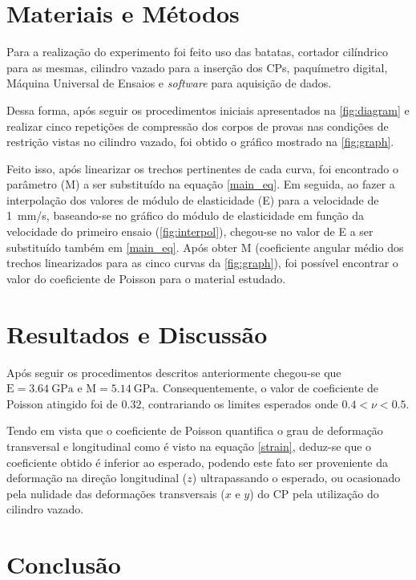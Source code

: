 \documentclass[a4paper, 12pt, brazilian]{article}
\begin{document}
	\section{Materiais e Métodos}
	
	Para a realização do experimento foi feito uso das batatas, cortador cilíndrico para as mesmas, cilindro vazado para a inserção dos CPs, paquímetro digital, Máquina Universal de Ensaios e \textit{software} para aquisição de dados. 
	
	Dessa forma, após seguir os procedimentos iniciais apresentados na  \cref{fig:diagram} e realizar cinco repetições de compressão dos corpos de provas nas condições de restrição vistas no cilindro vazado, foi obtido o gráfico mostrado na \cref{fig:graph}.
	
	Feito isso, após linearizar os trechos pertinentes de cada curva, foi encontrado o parâmetro (M) a ser substituído na equação \eqref{main_eq}. Em seguida, ao fazer a interpolação dos valores de módulo de elasticidade (E) para a velocidade de
	\SI{1}{\milli\meter/\second}, baseando-se no gráfico do módulo de elasticidade em função da velocidade do primeiro ensaio (\cref{fig:interpol}), chegou-se no valor de E a ser substituído também em \eqref{main_eq}. Após obter M (coeficiente angular médio dos trechos linearizados para as cinco curvas da \cref{fig:graph}), foi possível encontrar o valor do coeficiente de Poisson para o material estudado.
	
	\section{Resultados e Discussão}
	
	Após seguir os procedimentos descritos anteriormente chegou-se que  $\textrm{E}=\SI{3.64}{\giga\pascal}$ e $\textrm{M}=\SI{5.14}{\giga\pascal}$. Consequentemente, o valor de coeficiente de Poisson atingido foi de $0.32$, contrariando os limites esperados onde $0.4<\nu<0.5$. 
	
	Tendo em vista que o coeficiente de Poisson quantifica o grau de deformação transversal e longitudinal como é visto na equação \eqref{strain}, deduz-se que o coeficiente obtido é inferior ao esperado, podendo este fato ser proveniente da deformação na direção longitudinal ($z$) ultrapassando o esperado, ou ocasionado pela nulidade das deformações transversais ($x$ e $y$) do CP pela utilização do cilindro vazado.
	
	\section{Conclusão}
\end{document}
